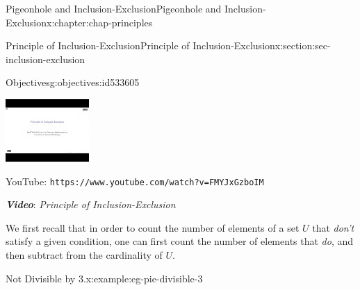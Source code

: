 \documentclass[oneside,10pt,]{book}
\newcommand{\mono}[1]{\texttt{#1}}
\newcommand{\alert}[1]{\textbf{\textit{#1}}}
\numberwithin{equation}{section}
\newlength{\qrsize}
\newlength{\previewwidth}
\begin{document}
\begin{chapterptx}{Pigeonhole and Inclusion-Exclusion}{}{Pigeonhole and Inclusion-Exclusion}{}{}{x:chapter:chap-principles}
\begin{sectionptx}{Principle of Inclusion-Exclusion}{}{Principle of Inclusion-Exclusion}{}{}{x:section:sec-inclusion-exclusion}
\begin{objectives}{Objectives}{g:objectives:id533605}
\begin{itemize}[label=\textbullet]
\end{itemize}
\end{objectives}
\begin{sidebyside}{1}{0}{0}{0}%
\begin{sbspanel}{1}%
\setlength{\qrsize}{9em}
\setlength{\previewwidth}{\linewidth}
\addtolength{\previewwidth}{-\qrsize}
\begin{tcbraster}[raster columns=2, raster column skip=1pt, raster halign=center, raster force size=false, raster left skip=0pt, raster right skip=0pt]%
\begin{tcolorbox}[previewstyle, width=\previewwidth]%
\includegraphics[width=0.80\linewidth,height=\qrsize,keepaspectratio]{images/video-inclusion-exclusion.jpg}%
\end{tcolorbox}%
\begin{tcolorbox}[qrstyle]%
{\hypersetup{urlcolor=black}}%
\end{tcolorbox}%
\begin{tcolorbox}[captionstyle]%
\small YouTube: \mono{https://www.youtube.com/watch?v=FMYJxGzboIM}\end{tcolorbox}%
\end{tcbraster}%
\end{sbspanel}%
\end{sidebyside}%
\par
\alert{Video}: \emph{Principle of Inclusion-Exclusion}%
\par
We first recall that in order to count the number of elements of a set \(U\) that \emph{don't} satisfy a given condition, one can first count the number of elements that \emph{do}, and then subtract from the cardinality of \(U\).%
\begin{example}{Not Divisible by 3.}{x:example:eg-pie-divisible-3}%

\end{example}
\end{sectionptx}
\end{chapterptx}
\end{document}
